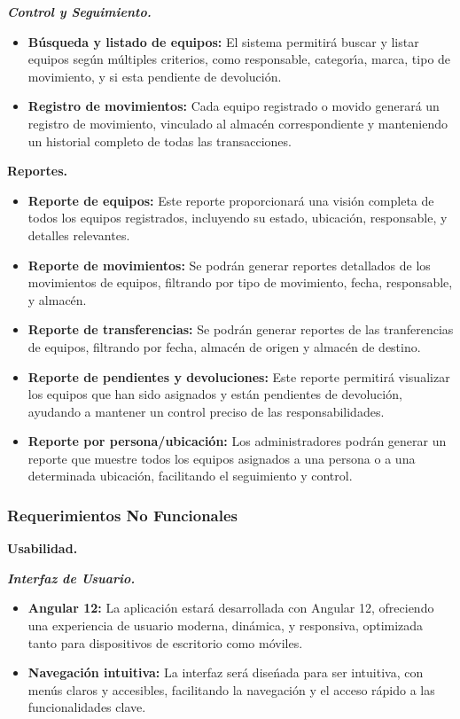 \documentclass[stu, 12pt, letterpaper, donotrepeattitle, floatsintext, natbib]{apa7}
\begin{document}
\textit{\textbf{Control y Seguimiento.}}
\begin{itemize}
    \item\textbf{B\'usqueda y listado de equipos: }El sistema permitir\'a buscar y listar equipos seg\'un m\'ultiples criterios, como responsable, categor\'{\i}a, marca, tipo de movimiento, y si esta pendiente de devoluci\'on.
    \item\textbf{Registro de movimientos: }Cada equipo registrado o movido generar\'a un registro de movimiento, vinculado al almac\'en correspondiente y manteniendo un historial completo de todas las transacciones.
\end{itemize}

\textbf{Reportes.}
\begin{itemize}
    \item\textbf{Reporte de equipos: }Este reporte proporcionar\'a una visi\'on completa de todos los equipos registrados, incluyendo su estado, ubicaci\'on, responsable, y detalles relevantes.
    \item\textbf{Reporte de movimientos: }Se podr\'an generar reportes detallados de los movimientos de equipos, filtrando por tipo de movimiento, fecha, responsable, y almac\'en.
    \item\textbf{Reporte de transferencias: }Se podr\'an generar reportes de las tranferencias de equipos, filtrando por fecha, almac\'en de origen y almac\'en de destino.
    \item\textbf{Reporte de pendientes y devoluciones: }Este reporte permitir\'a visualizar los equipos que han sido asignados y est\'an pendientes de devoluci\'on, ayudando a mantener un control preciso de las responsabilidades.
    \item\textbf{Reporte por persona/ubicaci\'on: }Los administradores podr\'an generar un reporte que muestre todos los equipos asignados a una persona o a una determinada ubicaci\'on, facilitando el seguimiento y control.
\end{itemize}
\subsubsection{Requerimientos No Funcionales}
\textbf{Usabilidad.}

\textit{\textbf{Interfaz de Usuario.}}
\begin{itemize}
    \item\textbf{Angular 12: }La aplicaci\'on estar\'a desarrollada con Angular 12, ofreciendo una experiencia de usuario moderna, din\'amica, y responsiva, optimizada tanto para dispositivos de escritorio como m\'oviles.
    \item\textbf{Navegaci\'on intuitiva: }La interfaz ser\'a dise\'{n}ada para ser intuitiva, con men\'us claros y accesibles, facilitando la navegaci\'on y el acceso r\'apido a las funcionalidades clave.
\end{itemize}
\end{document}
